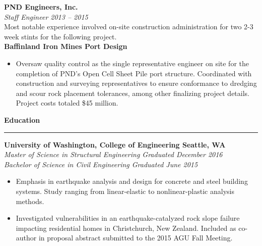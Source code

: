\documentclass[letterpaper,6pt]{article}
\newcommand{\ts}{\textsuperscript}
\begin{document}
\vspace{3mm}
\textbf{PND Engineers, Inc.} \\
\textit{Staff Engineer \hfill 2013 -- 2015} \\
Most notable experience involved on-site construction administration for two 2-3 week stints for the following project.\\
\textbf{\small{Baffinland Iron Mines Port Design}}
\begin{itemize}[itemsep=0.5mm,topsep=0pt]
    \item  Oversaw quality control as the single representative engineer on site for the completion of PND's Open Cell Sheet Pile\ts{\textregistered} port structure. Coordinated with construction and surveying representatives to ensure conformance to dredging and scour rock placement tolerances, among other finalizing project details. Project costs totaled \$45 million.
    \end{itemize}
    
\vspace{5mm}
{\large \textbf{Education}}
\vspace{0.5mm}
\hrule
\vspace{2mm}
\textbf{University of Washington, College of Engineering \hfill Seattle, WA} \\
\textit{Master of Science in Structural Engineering \hfill Graduated December 2016} \\
\textit{Bachelor of Science in Civil Engineering \hfill Graduated June 2015} %

\begin{itemize}[itemsep=0.5mm,topsep=0pt]
    \item  Emphasis in earthquake analysis and design for concrete and steel building systems. Study ranging from linear-elastic to nonlinear-plastic analysis methods. 
    \item  Investigated vulnerabilities in an earthquake-catalyzed rock slope failure impacting
        residential homes in Christchurch, New Zealand. Included as co-author in proposal abstract submitted to the 2015 AGU Fall Meeting. 
\end{itemize}
\end{document}
